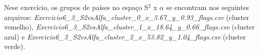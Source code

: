 \begin{figure}[ht!]
	\vspace{0mm}	%
	\begin{center}
	\end{center}
	\vspace{-2mm}	%
	\label{ex6_fig3}
\end{figure}

Nese exercício, os grupos de países no espaço S$^{2}$ x $\alpha$ se encontram nos seguintes arquivos: \textit{Exercicio6\_3\_S2vsAlfa\_cluster\_0\_x\_3.67\_y\_0.93\_flags.csv} (cluster vemelho), \textit{Exercicio6\_3\_S2vsAlfa\_cluster\_1\_x\_18.64\_y\_0.66\_flags.csv} (cluster azul) e \textit{Exercicio6\_3\_S2vsAlfa\_cluster\_2\_x\_53.82\_y\_1.04\_flags.csv} (cluster verde).

\clearpage

